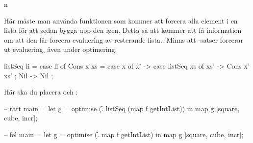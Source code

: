 n\documentclass[../Optimise]{subfiles}
\begin{document}
Här måste man använda funktionen  som kommer att forcera alla element
i en lista för att sedan bygga upp den igen. Detta så att  kommer
att få information om att den får forcera evaluering av resterande lista.. 
Minns att -satser forcerar ut evaluering, även under optimering.
\begin{codeEx}
listSeq li = case li of
    { Cons x xs = case x of
        { x' -> case listSeq xs of
            { xs' -> Cons x' xs'
            }
        }
    ; Nil -> Nil
    };
\end{codeEx}

Här ska du placera  och :
\begin{codeEx}
-- rätt
main = let g = optimise (\f . listSeq (map f getIntList))
       in  map g [square, cube, incr];

-- fel
main = let g = optimise (\f . map f getIntList)
       in  map g [square, cube, incr];
\end{codeEx}

%
%
%
%
%
%
%
%
%

\end{document}
